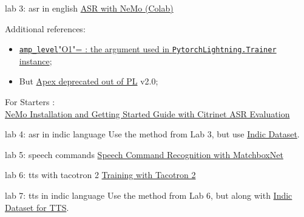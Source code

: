 \documentclass[aspectratio=169,xcolor={dvipsnames,svgnames}]{beamer}
\begin{document}
\begin{frame}[label=lab-3,fragile]{lab 3: asr in english}
 \href{https://colab.research.google.com/github/NVIDIA/NeMo/blob/stable/tutorials/asr/ASR\_with\_NeMo.ipynb}{ASR with NeMo (Colab)}

Additional references:
\begin{itemize}
\item \href{https://nvidia.github.io/apex/amp.html\#opt-levels}{\texttt{amp\_level}"O1"= : the argument used in
\texttt{PytorchLightning.Trainer} instance};
\item But \href{https://github.com/Lightning-AI/pytorch-lightning/pull/16039}{Apex deprecated out of PL} v2.0;
\end{itemize}

For Starters : \\[0pt]
\href{https://docs.nvidia.com/nemo-framework/user-guide/latest/nemotoolkit/starthere/intro.html\#quick-start-guide}{NeMo Installation and Getting Started Guide with
Citrinet ASR Evaluation}
\end{frame}

\begin{frame}[label=lab-4]{lab 4: asr in indic language}
Use the method from Lab 3, but use \href{https://github.com/AI4Bharat/vistaar}{Indic Dataset}.
\end{frame}

\begin{frame}[label=lab-5]{lab 5: speech commands}
\href{https://colab.research.google.com/github/NVIDIA/NeMo/blob/stable/tutorials/asr/Speech\_Commands.ipynb}{Speech Command Recognition with MatchboxNet}
\end{frame}

\begin{frame}[label=lab-6]{lab 6: tts with tacotron 2}
\href{https://colab.research.google.com/github/NVIDIA/NeMo/blob/stable/tutorials/tts/Tacotron2\_Training.ipynb}{Training with Tacotron 2}
\end{frame}

\begin{frame}[label=lab-7]{lab 7: tts in indic language}
Use the method from Lab 6, but along with \href{https://github.com/AI4Bharat/Indic-TTS}{Indic Dataset
for TTS}.
\end{frame}
\end{document}
